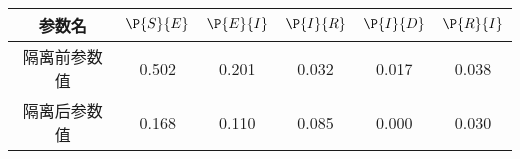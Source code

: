 \begin{tabular}{cccccc}
\hline
参数名&$\P{S}{E}$&$\P{E}{I}$&$\P{I}{R}$&$\P{I}{D}$&$\P{R}{I}$\\
\hline
隔离前参数值&0.502&0.201&0.032&0.017&0.038\\
隔离后参数值&0.168&0.110&0.085&0.000&0.030\\
\hline
\end{tabular}